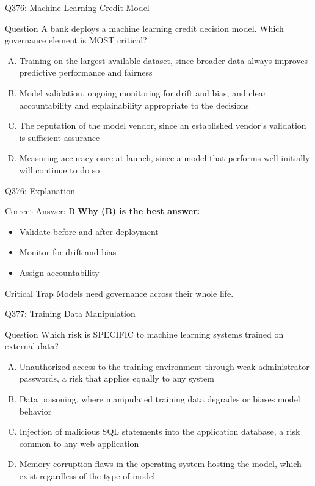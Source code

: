 \documentclass{beamer}
\begin{document}
	\begin{frame}{Q376: Machine Learning Credit Model}
		\begin{block}{Question}
			\small A bank deploys a machine learning credit decision model. Which governance element is MOST critical?
		\end{block}
		\begin{enumerate}[(A)]
			\footnotesize
			\item Training on the largest available dataset, since broader data always improves predictive performance and fairness
			\item Model validation, ongoing monitoring for drift and bias, and clear accountability and explainability appropriate to the decisions
			\item The reputation of the model vendor, since an established vendor's validation is sufficient assurance
			\item Measuring accuracy once at launch, since a model that performs well initially will continue to do so
		\end{enumerate}
	\end{frame}
	
	\begin{frame}{Q376: Explanation}
		\begin{block}{Correct Answer: B}
			\textbf{Why (B) is the best answer:}
			\begin{itemize}
				\item Validate before and after deployment
				\item Monitor for drift and bias
				\item Assign accountability
			\end{itemize}
		\end{block}
		\begin{alertblock}{Critical Trap}
			Models need governance across their whole life.
		\end{alertblock}
	\end{frame}
	
	\begin{frame}{Q377: Training Data Manipulation}
		\begin{block}{Question}
			\small Which risk is SPECIFIC to machine learning systems trained on external data?
		\end{block}
		\begin{enumerate}[(A)]
			\footnotesize
			\item Unauthorized access to the training environment through weak administrator passwords, a risk that applies equally to any system
			\item Data poisoning, where manipulated training data degrades or biases model behavior
			\item Injection of malicious SQL statements into the application database, a risk common to any web application
			\item Memory corruption flaws in the operating system hosting the model, which exist regardless of the type of model
		\end{enumerate}
	\end{frame}
	
\end{document}
